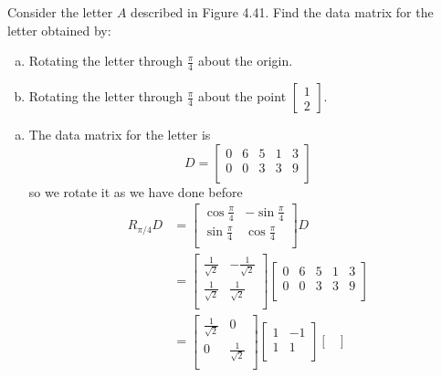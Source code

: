 \documentclass[../main.tex]{subfiles}
\begin{document}
Consider the letter $A$ described in Figure 4.41.
Find the data matrix for the letter obtained by:
\begin{enumerate}[a)]
	\item Rotating the letter through \(\frac{\pi}{4}\) about the origin.
	\item Rotating the letter through \(\frac{\pi}{4}\) about the point \(\begin{bmatrix}1\\2\end{bmatrix}\).
\end{enumerate}

\solution
\begin{enumerate}[a)]
	\item The data matrix for the letter is
		\[
			D
			=
			\begin{bmatrix}
				0 & 6 & 5 & 1 & 3 \\
				0 & 0 & 3 & 3 & 9 \\
			\end{bmatrix}
		\]
		so we rotate it as we have done before
		\begin{align*}
			R_{\pi/4}D
			&=
			\begin{bmatrix}
				\cos\frac{\pi}{4} & -\sin\frac{\pi}{4} \\
				\sin\frac{\pi}{4} & \cos\frac{\pi}{4} \\
			\end{bmatrix}
			D
			\\&=
			\begin{bmatrix}
				\frac{1}{\sqrt{2}} & -\frac{1}{\sqrt{2}} \\
				\frac{1}{\sqrt{2}} & \frac{1}{\sqrt{2}} \\
			\end{bmatrix}
			\begin{bmatrix}
				0 & 6 & 5 & 1 & 3 \\
				0 & 0 & 3 & 3 & 9 \\
			\end{bmatrix}
			\\&=
			\begin{bmatrix}
				\frac{1}{\sqrt{2}} & 0 \\
				0 & \frac{1}{\sqrt{2}} \\
			\end{bmatrix}
			\begin{bmatrix}
				1 & -1 \\
				1 & 1 \\
			\end{bmatrix}
			\begin{bmatrix}

\end{bmatrix}
\end{align*}
\end{enumerate}
\end{document}
